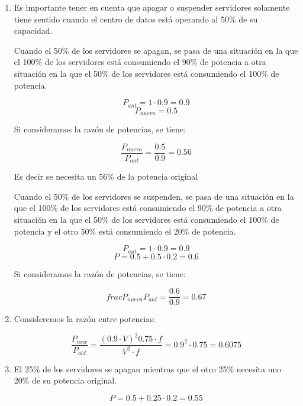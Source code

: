 \begin{enumerate}

\item Es importante tener en cuenta que apagar o suspender servidores solamente 
tiene sentido cuando el centro de datos está operando al 50\% de su capacidad.

Cuando el 50\% de los servidores se apagan, se pasa de una situación en la que
el 100\% de los servidores está consumiendo el 90\% de potencia a otra situación
en la que el 50\% de los servidores está consumiendo el 100\% de potencia.

\[P_{ant} = 1 \cdot 0.9 = 0.9\]
\[P_{nueva} = 0.5\]

Si consideramos la razón de potencias, se tiene:

\[\frac{P_{nueva}}{P_{ant}} = \frac{0.5}{0.9} = 0.56\]

Es decir se necesita un 56\% de la potencia original

Cuando el 50\% de los servidores se suspenden, se pasa de una situación en la que el
100\% de los servidores está consumiendo el 90\% de potencia a otra situación en la
que el 50\% de los servidores está consumiendo el 100\% de potencia y el otro
50\% está consumiendo el 20\% de potencia.

\[P_{ant} = 1 \cdot 0.9 = 0.9\]
\[P = 0.5 + 0.5 \cdot 0.2 = 0.6\]

Si consideramos la razón de potencias, se tiene:

\[frac{P_{nueva}}{P_{ant}} = \frac{0.6}{0.9} = 0.67\] 

\item Consideremos la razón entre potencias:

\[
\frac{P_{new}}{P_{old}} =
\frac{(0.9 \cdot V)^2 0.75 \cdot f}{V^2 \cdot f} =
0.9^2 \cdot 0.75 =
0.6075
\]

\item El 25\% de los servidores se apagan mientras que el otro 25\%
necesita uno 20\% de su potencia original.

\[
P = 0.5 + 0.25 \cdot 0.2 = 0.55
\]

\end{enumerate}

